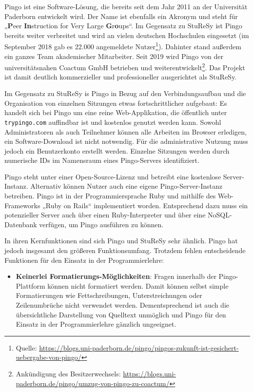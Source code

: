 Pingo ist eine Software-Lösung, die bereits seit dem Jahr 2011 an der Universität Paderborn entwickelt wird. Der Name ist ebenfalls ein Akronym und steht für „\textbf{P}eer \textbf{In}struction for Very Large \textbf{G}r\textbf{o}ups“. Im Gegensatz zu StuReSy ist Pingo bereits weiter verbreitet und wird an vielen deutschen Hochschulen eingesetzt (im September 2018 gab es 22.000 angemeldete Nutzer\footnote{Quelle:  \url{https://blogs.uni-paderborn.de/pingo/pingos-zukunft-ist-gesichert-uebergabe-von-pingo/}}). Dahinter stand außerdem ein ganzes Team akademischer Mitarbeiter. Seit 2019 wird Pingo von der universitätsnahen Coactum GmbH betrieben und weiterentwickelt\footnote{Ankündigung des Besitzerwechsels: \url{https://blogs.uni-paderborn.de/pingo/umzug-von-pingo-zu-coactum/}}. Das Projekt ist damit deutlich kommerzieller und professioneller ausgerichtet als StuReSy.

Im Gegensatz zu StuReSy is Pingo in Bezug auf den Verbindungsaufbau und die Organisation von einzelnen Sitzungen etwas fortschrittlicher aufgebaut: Es handelt sich bei Pingo um eine reine Web-Applikation, die öffentlich unter \texttt{trypingo.com} auffindbar ist und kostenlos genutzt werden kann. Sowohl Administratoren als auch Teilnehmer können alle Arbeiten im Browser erledigen, ein Software-Download ist nicht notwendig. Für die administrative Nutzung muss jedoch ein Benutzerkonto erstellt werden. Einzelne Sitzungen werden durch numerische IDs im Namensraum eines Pingo-Servers identifiziert.


Pingo steht unter einer Open-Source-Lizenz und betreibt eine kostenlose Server-Instanz. Alternativ können Nutzer auch eine eigene Pingo-Server-Instanz betreiben. Pingo ist in der Programmiersprache Ruby und mithilfe des Web-Frameworks „Ruby on Rails“ implementiert worden. Entsprechend dazu muss ein potenzieller Server auch über einen Ruby-Interpreter und über eine NoSQL-Datenbank verfügen, um Pingo ausführen zu können.

In ihren Kernfunktionen sind sich Pingo und StuReSy sehr ähnlich. Pingo hat jedoch insgesamt den größeren Funktionsumfang. Trotzdem fehlen entscheidende Funktionen für den Einsatz in der Programmierlehre:
\begin{itemize}
    \item \textbf{Keinerlei Formatierungs-Möglichkeiten}: Fragen innerhalb der Pingo-Plattform können nicht formatiert werden. Damit können selbst simple Formatierungen wie Fettschreibungen, Unterstreichungen oder Zeilenumbrüche nicht verwendet werden. Dementsprechend ist auch die übersichtliche Darstellung von Quelltext unmöglich und Pingo für den Einsatz in der Programmierlehre gänzlich ungeeignet.
\end{itemize}

